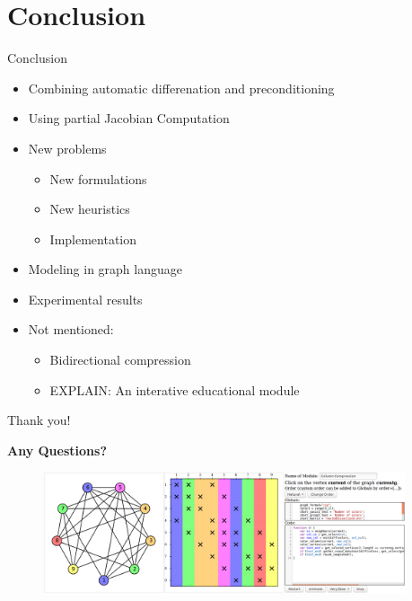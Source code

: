 \documentclass{beamer}
\begin{document}
\section{Conclusion}
\begin{frame}{Conclusion}
\begin{itemize}
\item Combining automatic differenation and preconditioning
\item Using partial Jacobian Computation
\item New problems
\begin{itemize}
\item New formulations
\item New heuristics
\item Implementation
\end{itemize}
\item Modeling in graph language
\item Experimental results
\item Not mentioned:
\begin{itemize}
\item Bidirectional compression
\item EXPLAIN: An interative educational module
\end{itemize}
\end{itemize}
\end{frame}

\begin{frame}{Thank you!}
\begin{center}
\bf Any Questions?
\end{center}
\begin{figure}
\centering
\includegraphics[width=0.95\textwidth]{custom_module}
\end{figure}
\end{frame}
\end{document}
